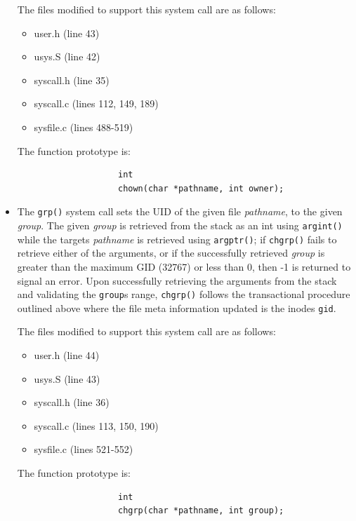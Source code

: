 \documentclass[11pt,letterpaper]{report}
\begin{document}
\begin{itemize}
				 The files modified to support this system call are as follows:				
					\begin{itemize}
										
					\item user.h (line 43)
					\item usys.S (line 42)
					\item syscall.h (line 35)
					\item syscall.c (lines 112, 149, 189)
					\item sysfile.c (lines 488-519)
					
					\end{itemize}
			
				The function prototype is:
				\begin{verbatim}
					int
					chown(char *pathname, int owner);
				\end{verbatim}
				
				
			\item The {\tt grp()} system call sets the UID of the given file \emph{pathname}, to the given \emph{group}. The given \emph{group}
				is retrieved from the stack as an int using {\tt argint()} while the targets \emph{pathname} is retrieved using  {\tt argptr()}; if {\tt chgrp()} fails to retrieve
				either of the arguments, or if the successfully retrieved \emph{group} is greater than the maximum GID (32767) or less than 0, then -1 is returned to signal an error.
				Upon successfully retrieving the arguments from the stack and validating the {\tt group}s range, {\tt chgrp()} follows the transactional procedure outlined above where 
				the file meta information updated is the inodes {\tt gid}.
							 
				 The files modified to support this system call are as follows:				
					\begin{itemize}
										
					\item user.h (line 44)
					\item usys.S (line 43)
					\item syscall.h (line 36)
					\item syscall.c (lines 113, 150, 190)
					\item sysfile.c (lines 521-552)
					
					\end{itemize}
			
				The function prototype is:
				\begin{verbatim}
					int
					chgrp(char *pathname, int group);
				\end{verbatim}
				
									
		\end{itemize} 
	
\end{document}
